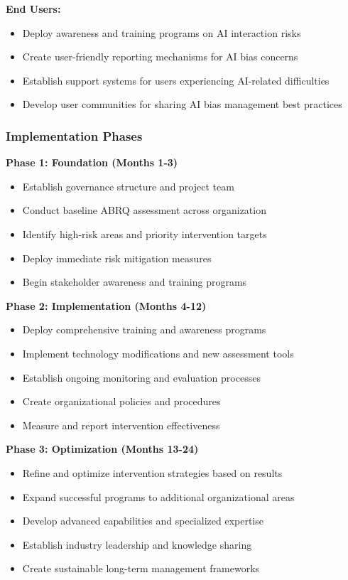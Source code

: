 \documentclass[11pt,a4paper]{article}
\begin{document}
\textbf{End Users:}
\begin{itemize}
\item Deploy awareness and training programs on AI interaction risks
\item Create user-friendly reporting mechanisms for AI bias concerns
\item Establish support systems for users experiencing AI-related difficulties
\item Develop user communities for sharing AI bias management best practices
\end{itemize}

\subsubsection{Implementation Phases}

\textbf{Phase 1: Foundation (Months 1-3)}
\begin{itemize}
\item Establish governance structure and project team
\item Conduct baseline ABRQ assessment across organization
\item Identify high-risk areas and priority intervention targets
\item Deploy immediate risk mitigation measures
\item Begin stakeholder awareness and training programs
\end{itemize}

\textbf{Phase 2: Implementation (Months 4-12)}
\begin{itemize}
\item Deploy comprehensive training and awareness programs
\item Implement technology modifications and new assessment tools
\item Establish ongoing monitoring and evaluation processes
\item Create organizational policies and procedures
\item Measure and report intervention effectiveness
\end{itemize}

\textbf{Phase 3: Optimization (Months 13-24)}
\begin{itemize}
\item Refine and optimize intervention strategies based on results
\item Expand successful programs to additional organizational areas
\item Develop advanced capabilities and specialized expertise
\item Establish industry leadership and knowledge sharing
\item Create sustainable long-term management frameworks
\end{itemize}
\end{document}
